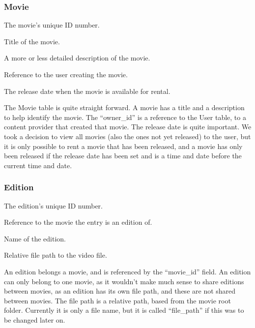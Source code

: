 \subsubsection{Movie}
\label{Design_Database_Tables_Movie}

\begin{my_description}
\item[movie\_id] The movie's unique ID number.
\item[title] Title of the movie.
\item[description] A more or less detailed description of the movie.
\item[owner\_id] Reference to the user creating the movie.
\item[release\_date] The release date when the movie is available for rental.
\end{my_description}

The Movie table is quite straight forward. A movie has a title and a description to help identify the movie. The ``owner\_id'' is a reference to the User table, to a content provider that created that movie. The release date is quite important. We took a decision to view all movies (also the ones not yet released) to the user, but it is only possible to rent a movie that has been released, and a movie has only been released if the release date has been set and is a time and date before the current time and date.

\subsubsection{Edition}
\label{Design_Database_Tables_Edition}

\begin{my_description}
\item[edition\_id] The edition's unique ID number.
\item[movie\_id] Reference to the movie the entry is an edition of.
\item[name] Name of the edition.
\item[file\_path] Relative file path to the video file.
\end{my_description}

An edition belongs a movie, and is referenced by the ``movie\_id'' field. An edition can only belong to one movie, as it wouldn't make much sense to share editions between movies, as an edition has its own file path, and these are not shared between movies. The file path is a relative path, based from the movie root folder. Currently it is only a file name, but it is called ``file\_path'' if this was to be changed later on.

